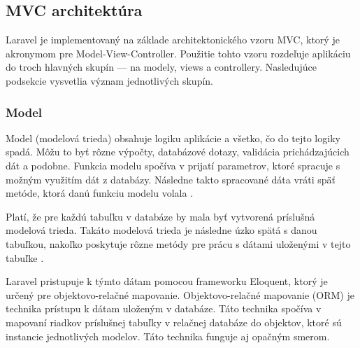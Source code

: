 \subsection{MVC architektúra}
Laravel je implementovaný na základe architektonického vzoru MVC, ktorý je akronymom pre Model-View-Controller. Použitie tohto vzoru rozdeľuje aplikáciu do troch hlavných skupín --- na modely, views a controllery. Nasledujúce podsekcie vysvetlia význam jednotlivých skupín.

\subsubsection*{Model}
Model (modelová trieda) obsahuje logiku aplikácie a všetko, čo do tejto logiky spadá. Môžu to byť rôzne výpočty, databázové dotazy, validácia prichádzajúcich dát a podobne. Funkcia modelu spočíva v prijatí parametrov, ktoré spracuje s možným využitím dát z databázy. Následne takto spracované dáta vráti späť metóde, ktorá danú funkciu modelu volala \cite{mvc-architektura}.

Platí, že pre každú tabuľku v databáze by mala byť vytvorená príslušná modelová trieda. Takáto modelová trieda je následne úzko spätá s danou tabuľkou, nakoľko poskytuje rôzne metódy pre prácu s dátami uloženými v tejto tabuľke \cite{co-je-eloquent}.

Laravel pristupuje k týmto dátam pomocou frameworku Eloquent, ktorý je určený pre objektovo-relačné mapovanie.
Objektovo-relačné mapovanie (ORM) je technika prístupu k dátam uloženým v databáze. Táto technika spočíva v mapovaní riadkov príslušnej tabuľky v relačnej databáze do objektov, ktoré sú instancie jednotlivých modelov. Táto technika funguje aj opačným smerom.

